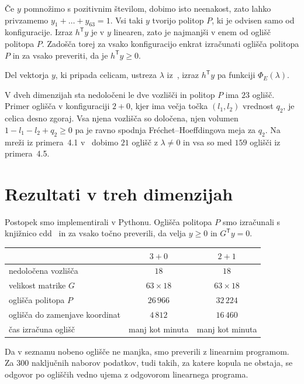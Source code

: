 \documentclass[11pt,a4paper]{article}
\begin{document}
Če $y$ pomnožimo s pozitivnim številom, dobimo isto neenakost, zato lahko privzamemo $y_1 + \dots + y_{63} = 1$. Vsi taki $y$ tvorijo politop $P$, ki je odvisen samo od konfiguracije. Izraz $h^{\mathsf T} y$ je v $y$ linearen, zato je najmanjši v enem od oglišč politopa $P$. Zadošča torej za vsako konfiguracijo enkrat izračunati oglišča politopa $P$ in za vsako preveriti, da je $h^{\mathsf T} y \ge 0$.

Del vektorja $y$, ki pripada celicam, ustreza $\lambda$ iz~\cite{OVZ}, izraz $h^{\mathsf T} y$ pa funkciji $\Phi_E(\lambda)$.

V dveh dimenzijah sta nedoločeni le dve vozlišči in politop $P$ ima $23$ oglišč. Primer oglišča v konfiguraciji $2+0$, kjer ima večja točka $(l_1, l_2)$ vrednost $q_2$, je celica desno zgoraj. Vsa njena vozlišča so določena, njen volumen $1 - l_1 - l_2 + q_2 \ge 0$ pa je ravno spodnja Fréchet--Hoeffdingova meja za $q_2$. Na mreži iz primera~4.1 v~\cite{OVZ} dobimo $21$ oglišč z $\lambda \ne 0$ in vsa so med $159$ oglišči iz primera~4.5.

\section{Rezultati v treh dimenzijah}

Postopek smo implementirali v Pythonu. Oglišča politopa $P$ smo izračunali s knjižnico cdd~\cite{cdd} in za vsako točno preverili, da velja $y \ge 0$ in $G^{\mathsf T} y = 0$.

\begin{center}
\begin{tabular}{lcc}
\toprule
 & $3+0$ & $2+1$ \\
\midrule
nedoločena vozlišča & $18$ & $18$ \\
velikost matrike $G$ & $63 \times 18$ & $63 \times 18$ \\
oglišča politopa $P$ & $26\,966$ & $32\,224$ \\
oglišča do zamenjave koordinat & $4\,812$ & $16\,460$ \\
čas izračuna oglišč & manj kot minuta & manj kot minuta \\
\bottomrule
\end{tabular}
\end{center}

Da v seznamu nobeno oglišče ne manjka, smo preverili z linearnim programom. Za $300$ naključnih naborov podatkov, tudi takih, za katere kopula ne obstaja, se odgovor po ogliščih vedno ujema z odgovorom linearnega programa.
\end{document}
